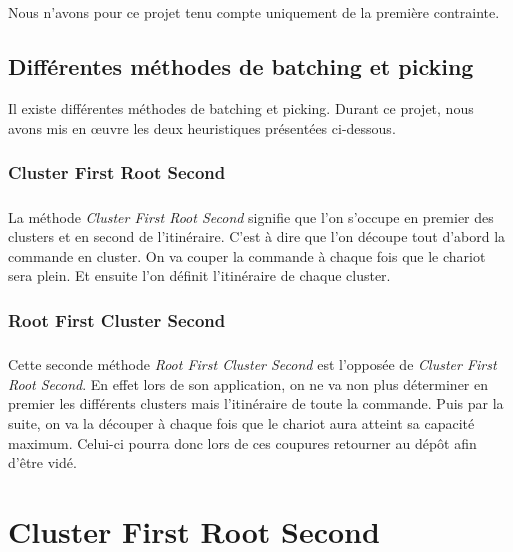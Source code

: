 \documentclass[twoside,UTF8]{EPURapport}
\begin{document}
\paragraph{}
Nous n'avons pour ce projet tenu compte uniquement de la première contrainte.

\section{Différentes méthodes de batching et picking}

Il existe différentes méthodes de batching et picking. Durant ce projet, nous avons mis en œuvre les deux heuristiques présentées ci-dessous.

\subsection{Cluster First Root Second}
\label{sec:CFRS}

\paragraph{}La méthode \textit{Cluster First Root Second} signifie que l'on s'occupe en premier des clusters et en second de l'itinéraire. C'est à dire que l'on découpe tout d'abord la commande en cluster. On va couper la commande à chaque fois que le chariot sera plein. Et ensuite l'on définit l'itinéraire de chaque cluster. 

\subsection{Root First Cluster Second}
\label{sec:RFCS}
\paragraph{}Cette seconde méthode \textit{Root First Cluster Second} est l'opposée de \textit{Cluster First Root Second}. En effet lors de son application, on ne va non plus déterminer en premier les différents clusters mais l'itinéraire de toute la commande. Puis par la suite, on va la découper à chaque fois que le chariot aura atteint sa capacité maximum. Celui-ci pourra donc lors de ces coupures retourner au dépôt afin d'être vidé.





\chapter{Cluster First Root Second}
\end{document}
